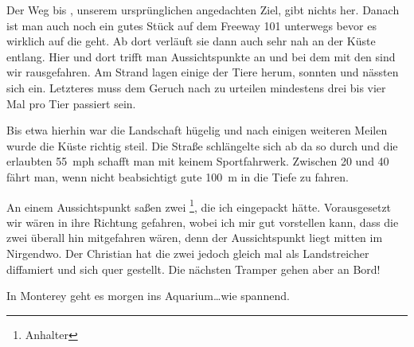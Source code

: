 Der Weg bis , unserem ursprünglichen angedachten Ziel, gibt nichts her.
Danach ist man auch noch ein gutes Stück auf dem Freeway 101 unterwegs bevor es wirklich auf die  geht.
Ab dort verläuft sie dann auch sehr nah an der Küste entlang.
Hier und dort trifft man Aussichtspunkte an und bei dem mit den  sind wir rausgefahren.
Am Strand lagen einige der Tiere herum, sonnten und nässten sich ein.
Letzteres muss dem Geruch nach zu urteilen mindestens drei bis vier Mal pro Tier passiert sein.

Bis etwa hierhin war die Landschaft hügelig und nach einigen weiteren Meilen wurde die Küste richtig steil.
Die Straße schlängelte sich ab da so durch und die erlaubten 55~mph schafft man mit keinem Sportfahrwerk.
Zwischen 20 und 40 fährt man, wenn nicht beabsichtigt gute 100~m in die Tiefe zu \glqq fahren\grqq.

\thispagestyle{empty}
\newpage

An einem Aussichtspunkt saßen zwei \footnote{Anhalter}, die ich eingepackt hätte.
Vorausgesetzt wir wären in ihre Richtung gefahren, wobei ich mir gut vorstellen kann, dass die zwei überall hin mitgefahren wären, denn der Aussichtspunkt liegt mitten im Nirgendwo.
Der Christian hat die zwei jedoch gleich mal als Landstreicher diffamiert und sich quer gestellt.
Die nächsten Tramper gehen aber an Bord!

In Monterey geht es morgen ins Aquarium\dots wie spannend.
